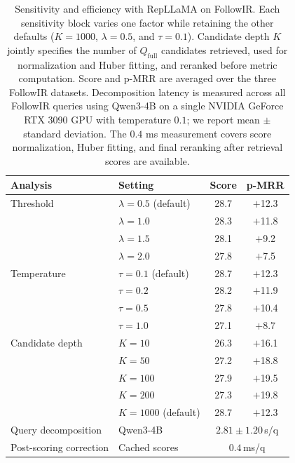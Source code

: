 \documentclass[letterpaper]{article}
\newcommand{\qbase}{Q_{\text{full}}}
\begin{document}
\begin{table}[t]
\centering
\small
\setlength{\tabcolsep}{3pt}
\begin{tabular}{llcc}
\toprule
\textbf{Analysis} & \textbf{Setting} & \textbf{Score} &
\textbf{p-MRR} \\
\midrule
Threshold & $\lambda=0.5$ (default) & 28.7 & $+$12.3 \\
& $\lambda=1.0$ & 28.3 & $+$11.8 \\
& $\lambda=1.5$ & 28.1 & $+$9.2 \\
& $\lambda=2.0$ & 27.8 & $+$7.5 \\
\addlinespace[2pt]
Temperature & $\tau=0.1$ (default) & 28.7 & $+$12.3 \\
& $\tau=0.2$ & 28.2 & $+$11.9 \\
& $\tau=0.5$ & 27.8 & $+$10.4 \\
& $\tau=1.0$ & 27.1 & $+$8.7 \\
\addlinespace[2pt]
Candidate depth & $K=10$ & 26.3 & $+$16.1 \\
& $K=50$ & 27.2 & $+$18.8 \\
& $K=100$ & 27.9 & $+$19.5 \\
& $K=200$ & 27.3 & $+$19.8 \\
& $K=1000$ (default) & 28.7 & $+$12.3 \\
\addlinespace[2pt]
Query decomposition & Qwen3-4B & \multicolumn{2}{c}{$2.81\mathbin{\pm}1.20$\,s/q} \\
Post-scoring correction & Cached scores & \multicolumn{2}{c}{$0.4$\,ms/q} \\
\bottomrule
\end{tabular}
\caption{Sensitivity and efficiency with RepLLaMA on FollowIR.  Each
sensitivity block varies one factor while retaining the other defaults
($K{=}1000$, $\lambda{=}0.5$, and $\tau{=}0.1$).  Candidate depth $K$ jointly
specifies the number of $\qbase$ candidates retrieved, used for normalization
and Huber fitting, and reranked before metric computation.  Score and p-MRR are
averaged over the three FollowIR datasets.  Decomposition latency is measured
across all FollowIR queries using Qwen3-4B on a single NVIDIA GeForce RTX 3090
GPU with temperature $0.1$; we report mean $\pm$ standard deviation.  The
$0.4$ ms measurement covers score normalization, Huber fitting, and final
reranking after retrieval scores are available.}
\label{tab:sensitivity-efficiency}
\end{table}
\end{document}
